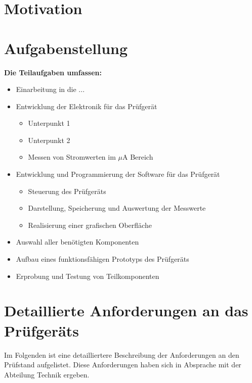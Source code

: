 \section{Motivation}
\clearpage

\section{Aufgabenstellung}

\textbf{Die Teilaufgaben umfassen:}

\begin{itemize}
	\item Einarbeitung in die ...
	\item Entwicklung der Elektronik für das Prüfgerät
	\begin{itemize}
		\item Unterpunkt 1
		\item Unterpunkt 2
		\item Messen von Stromwerten im \(\mu\)A Bereich
	\end{itemize}
	\item Entwicklung und Programmierung der Software für das Prüfgerät
	\begin{itemize}
		\item Steuerung des Prüfgeräts
		\item Darstellung, Speicherung und Auswertung der Messwerte
		\item Realisierung einer grafischen Oberfläche
	\end{itemize}
	\item Auswahl aller benötigten Komponenten
	\item Aufbau eines funktionsfähigen Prototyps des Prüfgeräts
	\item Erprobung und Testung von Teilkomponenten
\end{itemize}
\clearpage

\section{Detaillierte Anforderungen an das Prüfgeräts}
Im Folgenden ist eine detailliertere Beschreibung der Anforderungen an den Prüfstand aufgelistet.
Diese Anforderungen haben sich in Absprache mit der Abteilung Technik ergeben.